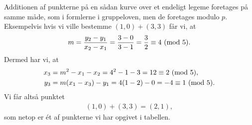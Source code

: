 Additionen af punkterne på en sådan kurve over et endeligt legeme foretages på samme måde, som i formlerne i gruppeloven, men de foretages modulo $p$. Eksempelvis hvis vi ville bestemme $(1,0) + (3,3)$ får vi, at 
\begin{align*} 
	m = \frac{y_2 - y_1}{x_2 - x_1} = \frac{3 - 0}{3 - 1} = \frac{3}{2} \equiv 4 \ (\mathrm{mod} \ 5).
\end{align*}
Dermed har vi, at 
\begin{align*}
	x_3 &= m^2 - x_1 - x_2 = 4^2 - 1 - 3 = 12 \equiv 2 \ (\mathrm{mod} \ 5), \\
	y_3 &= m(x_1 - x_3) - y_1 = 4(1-2)-0 = -4 \equiv 1 \ (\mathrm{mod} \ 5).
\end{align*}
Vi får altså punktet
\begin{align*}
	(1, 0) + (3, 3) = (2, 1),
\end{align*}
som netop er ét af punkterne vi har opgivet i tabellen.

